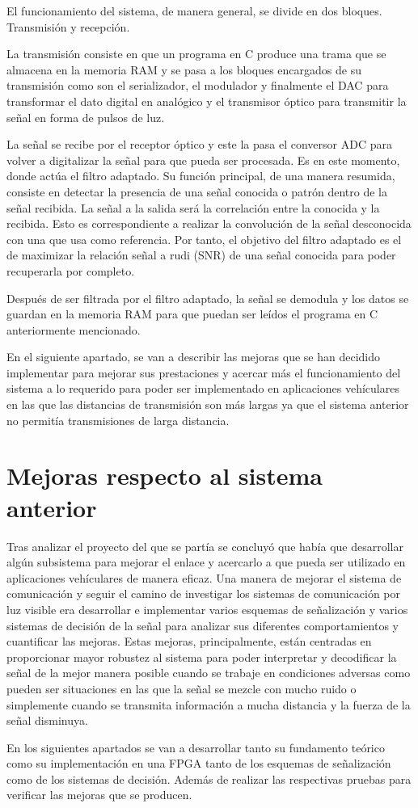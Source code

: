 El funcionamiento del sistema, de manera general, se divide en dos bloques. Transmisión y 
recepción. 

La transmisión consiste en que un programa en C 
produce una trama que se almacena en la memoria RAM y se pasa a los bloques encargados
de su transmisión como son el serializador, el modulador y finalmente el DAC para 
transformar el dato digital en analógico y el transmisor óptico para transmitir la señal
en forma de pulsos de luz. 

La señal se recibe por el receptor óptico y este la pasa el conversor ADC para volver 
a digitalizar la señal para que pueda ser procesada. Es en este momento, donde actúa el 
filtro adaptado. Su función principal, de una manera resumida, consiste en detectar la 
presencia de una señal conocida o patrón dentro de la señal recibida. La señal a la
salida será la correlación entre la conocida y la recibida. Esto es correspondiente
a realizar la convolución de la señal desconocida con una que usa como referencia.
Por tanto, el objetivo del filtro adaptado es el de maximizar la relación señal a rudi 
(SNR) de una señal conocida para poder recuperarla por completo.

Después de  ser filtrada por el filtro adaptado, la señal se demodula y los datos se 
guardan
en la memoria RAM para que puedan ser leídos el programa en C anteriormente mencionado.

En el siguiente apartado, se van a describir las mejoras que se han decidido
implementar para mejorar sus prestaciones y acercar más el funcionamiento del sistema 
a lo requerido para poder ser implementado en aplicaciones vehículares en las que las 
distancias de transmisión son más largas ya que el sistema anterior no permitía 
transmisiones de larga distancia. 

\section{Mejoras respecto al sistema anterior}
Tras analizar el proyecto del que se partía se concluyó que había que desarrollar algún 
subsistema para mejorar el enlace y acercarlo a que pueda ser utilizado en aplicaciones
vehículares de manera eficaz. Una manera de mejorar el 
sistema de comunicación y seguir el camino de investigar los sistemas de comunicación por 
luz visible era desarrollar e implementar varios esquemas de señalización y varios sistemas
de decisión de la señal para analizar sus diferentes comportamientos y cuantificar las 
mejoras. Estas mejoras, principalmente, están centradas en proporcionar mayor robustez al 
sistema para poder interpretar y decodificar la señal de la mejor manera posible cuando
se trabaje en condiciones adversas como pueden ser situaciones en las que la señal se 
mezcle con mucho ruido o simplemente cuando se transmita información a mucha distancia y 
la fuerza de la señal disminuya.

En los siguientes apartados se van a desarrollar tanto su fundamento teórico como su 
implementación en una FPGA tanto de los esquemas de señalización como de los 
sistemas de decisión. Además de realizar las respectivas pruebas para verificar las
mejoras que se producen.

\chapterend{}
